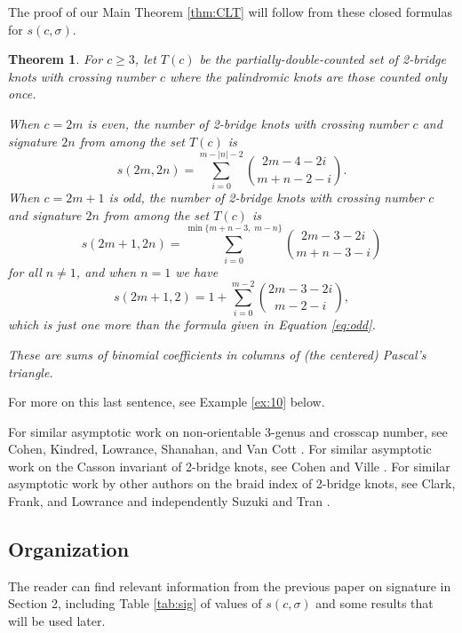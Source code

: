 \documentclass[11pt]{amsart}
\newtheorem{theorem}{Theorem}[section]
\theoremstyle{definition}
\theoremstyle{remark}
\numberwithin{equation}{section}
\begin{document}
The proof of our Main Theorem \ref{thm:CLT} will follow from these closed formulas for $s(c,\sigma)$.

\begin{theorem}
\label{thm:sums}
For $c\geq 3$, let $T(c)$ be the partially-double-counted set of 2-bridge knots with crossing number $c$ where the palindromic knots are those counted only once.

When $c=2m$ is even, the number of 2-bridge knots with crossing number $c$ and signature $2n$ from among the set $T(c)$ is 
\begin{equation}
\label{eq:even}
  s(2m,2n)=\displaystyle\sum_{i=0}^{m-|n|-2}{2m-4-2i\choose m+n-2-i}.  
\end{equation}    
When $c=2m+1$ is odd, the number of 2-bridge knots with crossing number $c$ and signature $2n$ from among the set $T(c)$ is 
\begin{equation}
\label{eq:odd}
    s(2m+1,2n)=\sum_{i=0}^{\min\{m+n-3,\; m-n\}}{2m-3-2i\choose m+n-3-i}
\end{equation}
for all $n \neq 1$, %
and when $n=1$ we have
\begin{equation}
\label{eq:odd2}
    s(2m+1,2)=1+\sum_{i=0}^{m-2}{2m-3-2i\choose m-2-i},
\end{equation}
which is just one more than the formula given in Equation \eqref{eq:odd}.

These are sums of binomial coefficients in columns of (the centered) Pascal's triangle.
\end{theorem}


For more on this last sentence, see Example \ref{ex:10} below.

For similar asymptotic work on non-orientable 3-genus and crosscap number, see Cohen, Kindred, Lowrance, Shanahan, and Van Cott \cite{CKLSVC}.  For similar asymptotic work on the Casson invariant of 2-bridge knots, see Cohen and Ville \cite{CohVil}.  For similar asymptotic work by other authors on the braid index of 2-bridge knots, see Clark, Frank, and Lowrance \cite{LowURSI:braids} and independently Suzuki and Tran \cite{SuzTra:braids}.  




\subsection*{Organization}  The reader can find relevant information from the previous paper \cite{CLMR} on signature in Section 2, including Table \ref{tab:sig} of values of $s(c,\sigma)$ and some results that will be used later.
\end{document}
